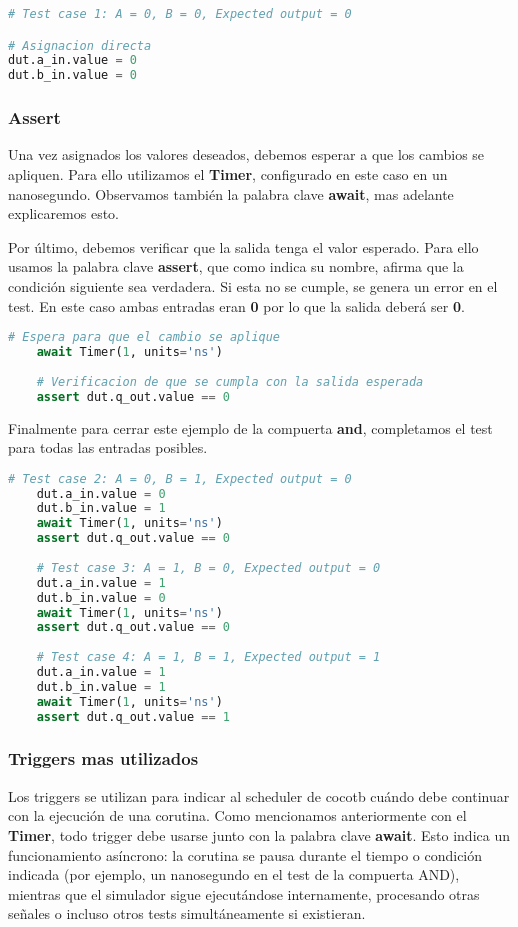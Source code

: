 \documentclass[a4paper,12pt]{article}
\begin{document}
\begin{lstlisting}[language=Python, caption=and\_tb.py, frame=lines]
# Test case 1: A = 0, B = 0, Expected output = 0

# Asignacion directa
dut.a_in.value = 0
dut.b_in.value = 0

\end{lstlisting}

\subsubsection{Assert}
Una vez asignados los valores deseados, debemos esperar a que los cambios se apliquen. Para ello utilizamos el \textbf{Timer}, configurado en este caso en un nanosegundo. Observamos también la palabra clave \textbf{await}, mas adelante explicaremos esto.

Por último, debemos verificar que la salida tenga el valor esperado. Para ello usamos la palabra clave \textbf{assert}, que como indica su nombre, afirma que la condición siguiente sea verdadera. Si esta no se cumple, se genera un error en el test. En este caso ambas entradas eran \textbf{0} por lo que la salida deberá ser \textbf{0}.

\begin{lstlisting}[language=Python, caption=and\_tb.py, frame=lines]
	# Espera para que el cambio se aplique
	await Timer(1, units='ns')
	
	# Verificacion de que se cumpla con la salida esperada
	assert dut.q_out.value == 0
\end{lstlisting}

Finalmente para cerrar este ejemplo de la compuerta \textbf{and}, completamos el test para todas las entradas posibles.

\begin{lstlisting}[language=Python, caption=and\_tb.py, frame=lines]
	# Test case 2: A = 0, B = 1, Expected output = 0
	dut.a_in.value = 0
	dut.b_in.value = 1
	await Timer(1, units='ns')
	assert dut.q_out.value == 0
	
	# Test case 3: A = 1, B = 0, Expected output = 0
	dut.a_in.value = 1
	dut.b_in.value = 0
	await Timer(1, units='ns')
	assert dut.q_out.value == 0
	
	# Test case 4: A = 1, B = 1, Expected output = 1
	dut.a_in.value = 1
	dut.b_in.value = 1
	await Timer(1, units='ns')
	assert dut.q_out.value == 1
\end{lstlisting}

\subsubsection{Triggers mas utilizados}
Los triggers se utilizan para indicar al scheduler de cocotb cuándo debe continuar con la ejecución de una corutina. Como mencionamos anteriormente con el \textbf{Timer}, todo trigger debe usarse junto con la palabra clave \textbf{await}. Esto indica un funcionamiento asíncrono: la corutina se pausa durante el tiempo o condición indicada (por ejemplo, un nanosegundo en el test de la compuerta AND), mientras que el simulador sigue ejecutándose internamente, procesando otras señales o incluso otros tests simultáneamente si existieran.
\end{document}

